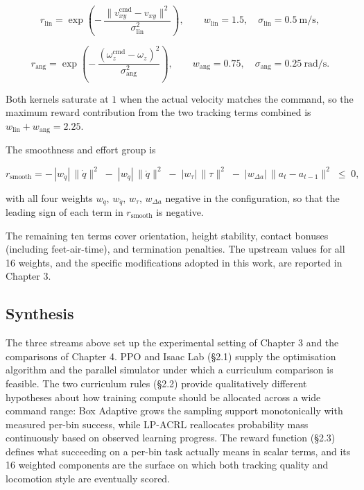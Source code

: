\[
r_{\mathrm{lin}} = \exp\!\left( -\, \frac{\| v_{xy}^{\mathrm{cmd}} - v_{xy} \|^2}{\sigma_{\mathrm{lin}}^{2}} \right), \qquad w_{\mathrm{lin}} = 1.5, \quad \sigma_{\mathrm{lin}} = 0.5\ \mathrm{m/s},
\]

\[
r_{\mathrm{ang}} = \exp\!\left( -\, \frac{(\omega_z^{\mathrm{cmd}} - \omega_z)^2}{\sigma_{\mathrm{ang}}^{2}} \right), \qquad w_{\mathrm{ang}} = 0.75, \quad \sigma_{\mathrm{ang}} = 0.25\ \mathrm{rad/s}.
\]

Both kernels saturate at $1$ when the actual velocity matches the command, so the maximum reward contribution from the two tracking terms combined is $w_{\mathrm{lin}} + w_{\mathrm{ang}} = 2.25$.

The smoothness and effort group is

\[
r_{\mathrm{smooth}} = -\,|w_{\dot{q}}|\, \|\dot{q}\|^2 \;-\; |w_{\ddot{q}}|\, \|\ddot{q}\|^2 \;-\; |w_\tau|\, \|\tau\|^2 \;-\; |w_{\Delta a}|\, \|a_t - a_{t-1}\|^2 \;\le\; 0,
\]

with all four weights $w_{\dot{q}},\, w_{\ddot{q}},\, w_\tau,\, w_{\Delta a}$ negative in the configuration, so that the leading sign of each term in $r_{\mathrm{smooth}}$ is negative.

The remaining ten terms cover orientation, height stability, contact bonuses (including feet-air-time), and termination penalties. The upstream values for all 16 weights, and the specific modifications adopted in this work, are reported in Chapter 3.

\subsection{Synthesis}

The three streams above set up the experimental setting of Chapter 3 and the comparisons of Chapter 4. PPO and Isaac Lab (\S2.1) supply the optimisation algorithm and the parallel simulator under which a curriculum comparison is feasible. The two curriculum rules (\S2.2) provide qualitatively different hypotheses about how training compute should be allocated across a wide command range: Box Adaptive grows the sampling support monotonically with measured per-bin success, while LP-ACRL reallocates probability mass continuously based on observed learning progress. The reward function (\S2.3) defines what succeeding on a per-bin task actually means in scalar terms, and its 16 weighted components are the surface on which both tracking quality and locomotion style are eventually scored.
